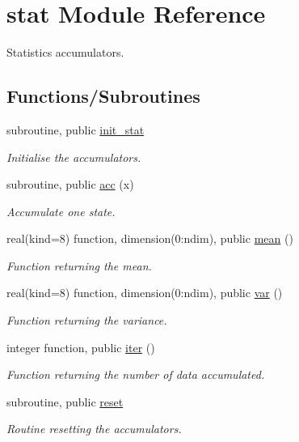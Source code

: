 \hypertarget{namespacestat}{}\section{stat Module Reference}
\label{namespacestat}


Statistics accumulators.  


\subsection*{Functions/\+Subroutines}
\begin{DoxyCompactItemize}
\item 
subroutine, public \hyperlink{namespacestat_a17919a94d519a3b63199ca52590f03c8}{init\+\_\+stat}
\begin{DoxyCompactList}\small\item\em Initialise the accumulators. \end{DoxyCompactList}\item 
subroutine, public \hyperlink{namespacestat_a2f642f26a42651e2c0e7275b690deabe}{acc} (x)
\begin{DoxyCompactList}\small\item\em Accumulate one state. \end{DoxyCompactList}\item 
real(kind=8) function, dimension(0\+:ndim), public \hyperlink{namespacestat_ada9a5b64e944a67f5b840d7b91990100}{mean} ()
\begin{DoxyCompactList}\small\item\em Function returning the mean. \end{DoxyCompactList}\item 
real(kind=8) function, dimension(0\+:ndim), public \hyperlink{namespacestat_a32f0c1c215da5a0f2b92672ddb53dd13}{var} ()
\begin{DoxyCompactList}\small\item\em Function returning the variance. \end{DoxyCompactList}\item 
integer function, public \hyperlink{namespacestat_aca30ccb65a1fc6af92be1018ec40f6c6}{iter} ()
\begin{DoxyCompactList}\small\item\em Function returning the number of data accumulated. \end{DoxyCompactList}\item 
subroutine, public \hyperlink{namespacestat_aaf88c5c208ce1fac886a9e3c0ee5ae08}{reset}
\begin{DoxyCompactList}\small\item\em Routine resetting the accumulators. \end{DoxyCompactList}\end{DoxyCompactItemize}
